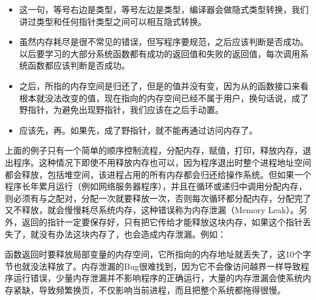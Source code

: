 \begin{itemize}

\item {}这一句，等号右边是类型，等号左边是类型，编译器会做隐式类型转换，我们讲过类型和任何指针类型之间可以相互隐式转换。

\item 虽然内存耗尽是很不常见的错误，但写程序要规范，之后应该判断是否成功。以后要学习的大部分系统函数都有成功的返回值和失败的返回值，每次调用系统函数都应该判断是否成功。

\item {}之后，所指的内存空间是归还了，但是的值并没有变，因为从的函数接口来看根本就没法改变的值，现在指向的内存空间已经不属于用户，换句话说，成了野指针，为避免出现野指针，我们应该在之后手动置。

\item 应该先，再。如果先，成了野指针，就不能再通过访问内存了。
\end{itemize}


上面的例子只有一个简单的顺序控制流程，分配内存，赋值，打印，释放内存，退出程序。这种情况下即使不用释放内存也可以，因为程序退出时整个进程地址空间都会释放，包括堆空间，该进程占用的所有内存都会归还给操作系统。但如果一个程序长年累月运行（例如网络服务器程序），并且在循环或递归中调用分配内存，则必须有与之配对，分配一次就要释放一次，否则每次循环都分配内存，分配完了又不释放，就会慢慢耗尽系统内存，这种错误称为内存泄漏（Memory Leak）。另外，返回的指针一定要保存好，只有把它传给才能释放这块内存，如果这个指针丢失了，就没有办法这块内存了，也会造成内存泄漏。例如：




函数返回时要释放局部变量的内存空间，它所指向的内存地址就丢失了，这10个字节也就没法释放了。内存泄漏的Bug很难找到，因为它不会像访问越界一样导致程序运行错误，少量内存泄漏并不影响程序的正确运行，大量的内存泄漏会使系统内存紧缺，导致频繁换页，不仅影响当前进程，而且把整个系统都拖得很慢。



